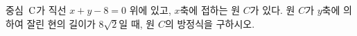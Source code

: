 중심~$\mathrm{C}$가 직선 $x+y-8=0$ 위에 있고, $x$축에 접하는 원 $C$가 있다. 원 $C$가 $y$축에 의하여 잘린 현의 길이가 $8\sqrt{2}$일 때, 원 $C$의 방정식을 구하시오. 
